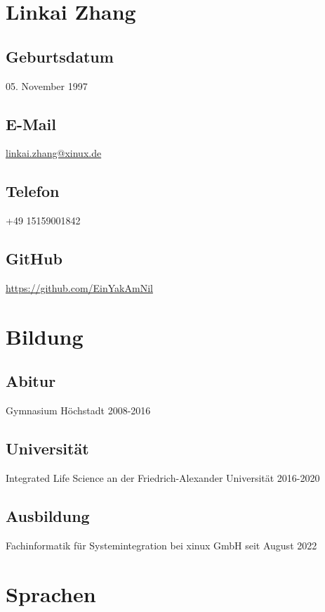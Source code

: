 \documentclass{article}
\begin{document}
\author{Linkai Zhang}

\section{Linkai Zhang}

\subsection{Geburtsdatum}
05. November 1997

\subsection{E-Mail}
\href{linkai.zhang@xinux.de}{linkai.zhang@xinux.de}

\subsection{Telefon}
+49 15159001842

\subsection{GitHub}
\href{https://github.com/EinYakAmNil}{https://github.com/EinYakAmNil}

\section{Bildung}

\subsection{Abitur}
Gymnasium Höchstadt 2008-2016

\subsection{Universität}
Integrated Life Science an der Friedrich-Alexander Universität 2016-2020

\subsection{Ausbildung}
Fachinformatik für Systemintegration bei xinux GmbH seit August 2022

\section{Sprachen}
\end{document}
